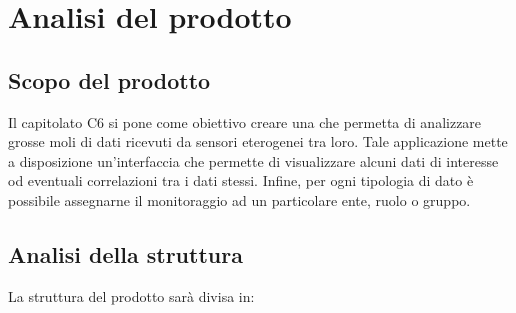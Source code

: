 \section{Analisi del prodotto}
	\subsection{Scopo del prodotto}
		Il capitolato C6 si pone come obiettivo creare una  che permetta di analizzare grosse moli di dati ricevuti da sensori eterogenei tra loro. Tale applicazione mette a disposizione un'interfaccia che permette di visualizzare alcuni dati di interesse od eventuali correlazioni tra i dati stessi. Infine, per ogni tipologia di dato è possibile assegnarne il monitoraggio ad un particolare ente, ruolo o gruppo.
		
	\subsection{Analisi della struttura}
		La struttura del prodotto sarà divisa in:
